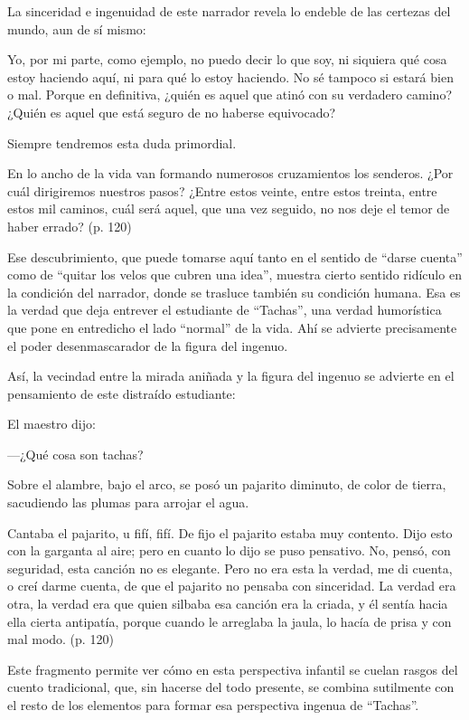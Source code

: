 \documentclass[14pt,twoside,final]{extbook} %
\begin{document}
La sinceridad e ingenuidad de este narrador revela lo endeble de las certezas del mundo, aun de sí mismo:
\begin{quoting}
Yo, por mi parte, como ejemplo, no puedo decir lo que soy, ni siquiera qué cosa estoy haciendo aquí, ni para qué lo estoy haciendo. No sé tampoco si estará bien o mal. Porque en definitiva, ¿quién es aquel que atinó con su verdadero camino? ¿Quién es aquel que está seguro de no haberse equivocado?

Siempre tendremos esta duda primordial.

En lo ancho de la vida van formando numerosos cruzamientos los senderos. ¿Por cuál dirigiremos nuestros pasos? ¿Entre estos veinte, entre estos treinta, entre estos mil caminos, cuál será aquel, que una vez seguido, no nos deje el temor de haber errado? (p. 120)
\end{quoting}
Ese descubrimiento, que puede tomarse aquí tanto en el sentido de ``darse cuenta'' como de ``quitar los velos que cubren una idea'', muestra cierto sentido ridículo en la condición del narrador, donde se trasluce también su condición humana. Esa es la verdad que deja entrever el estudiante de ``Tachas'', una verdad humorística que pone en entredicho el lado ``normal'' de la vida. Ahí se advierte precisamente el poder desenmascarador de la figura del ingenuo.

Así, la vecindad entre la mirada aniñada y la figura del ingenuo se advierte en el pensamiento de este distraído estudiante:
\begin{quoting}
El maestro dijo:

---¿Qué cosa son tachas?

Sobre el alambre, bajo el arco, se posó un pajarito diminuto, de color de tierra, sacudiendo las plumas para arrojar el agua.

Cantaba el pajarito, u fifí, fifí. De fijo el pajarito estaba muy contento. Dijo esto con la garganta al aire; pero en cuanto lo dijo se puso pensativo. No, pensó, con seguridad, esta canción no es elegante. Pero no era esta la verdad, me di cuenta, o creí darme cuenta, de que el pajarito no pensaba con sinceridad. La verdad era otra, la verdad era que quien silbaba esa canción era la criada, y él sentía hacia ella cierta antipatía, porque cuando le arreglaba la jaula, lo hacía de prisa y con mal modo. (p. 120)
\end{quoting}
Este fragmento permite ver cómo en esta perspectiva infantil se cuelan rasgos del cuento tradicional, que, sin hacerse del todo presente, se combina sutilmente con el resto de los elementos para formar esa perspectiva ingenua de ``Tachas''.
\end{document}
